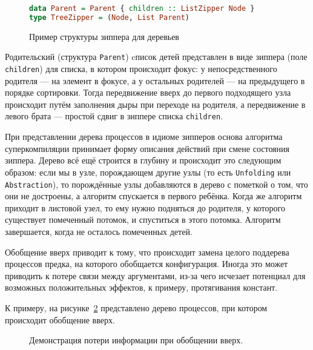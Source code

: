\begin{figure}[h!]
\begin{lstlisting}[mathescape,language=Haskell,extendedchars=\true,frame=single,basicstyle=\ttfamily]
data Parent = Parent { children :: ListZipper Node }
type TreeZipper = (Node, List Parent)
\end{lstlisting}
\caption{Пример структуры зиппера для деревьев}
\label{fig:zipper}
\end{figure}

Родительский (структура \lstinline{Parent}) cписок детей представлен в виде зиппера (поле \lstinline{children})
для списка, в котором происходит фокус: у непосредственного родителя --- на элемент в фокусе, а у остальных
родителей --- на предыдущего в порядке сортировки.
Тогда передвижение вверх до первого подходящего узла происходит путём
заполнения дыры при переходе на родителя, а передвижение в левого брата ---
простой сдвиг в зиппере списка \lstinline{children}.

При представлении дерева процессов в идиоме зипперов основа алгоритма
суперкомпиляции принимает форму описания действий при смене состояния зиппера.
Дерево всё ещё строится в глубину и происходит это следующим образом:
если мы в узле, порождающем другие узлы (то есть \lstinline{Unfolding}
или \lstinline{Abstraction}), то порождённые узлы добавляются в дерево
с пометкой о том, что они не достроены, а алгоритм спускается в первого
ребёнка. Когда же алгоритм приходит в листовой узел, то ему нужно подняться
до родителя, у которого существует помеченный потомок, и спуститься в этого
потомка. Алгоритм завершается, когда не осталось помеченных детей.

Обобщение вверх приводит к тому, что происходит замена целого поддерева процессов
предка, на которого обобщается конфигурация. Иногда это может приводить к потере
связи между аргументами, из-за чего исчезает потенциал для возможных
положительных эффектов, к примеру, протягивания констант.

К примеру, на рисунке~\ref{fig:genup} представлено дерево процессов, при котором происходит обобщение вверх.

\begin{figure}[h!]
\center
{}
\caption{Демонстрация потери информации при обобщении вверх.}
\label{fig:genup}
\end{figure}

